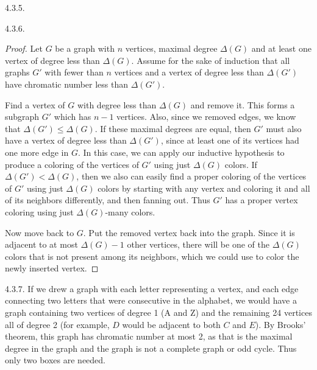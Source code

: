 \begin {itemize}
\begin{ans}{4.3.5.}
		\begin{center}
		\end{center}
	
\end{ans}
\begin{ans}{4.3.6.}
		\begin{proof}
		Let $G$ be a graph with $n$ vertices, maximal degree $\Delta(G)$ and at least one vertex of degree less than $\Delta(G)$.  Assume for the sake of induction that all graphs $G'$ with fewer than $n$ vertices and a vertex of degree less than $\Delta(G')$ have chromatic number less than $\Delta(G')$.

		Find a vertex of $G$ with degree less than $\Delta(G)$ and remove it.  This forms a subgraph $G'$ which has $n-1$ vertices.  Also, since we removed edges, we know that $\Delta(G') \le \Delta(G)$.  If these maximal degrees are equal, then $G'$ must also have a vertex of degree less than $\Delta(G')$, since at least one of its vertices had one more edge in $G$.  In this case, we can apply our inductive hypothesis to produce a coloring of the vertices of $G'$ using just $\Delta(G)$ colors.  If $\Delta(G') < \Delta(G)$, then we also can easily find a proper coloring of the vertices of $G'$ using just $\Delta(G)$ colors by starting with any vertex and coloring it and all of its neighbors differently, and then fanning out.  Thus $G'$ has a proper vertex coloring using just $\Delta(G)$-many colors.

		Now move back to $G$.  Put the removed vertex back into the graph.  Since it is adjacent to at most $\Delta(G) - 1$ other vertices, there will be one of the $\Delta(G)$ colors that is not present among its neighbors, which we could use to color the newly inserted vertex.
		\end{proof}
	
\end{ans}
\begin{ans}{4.3.7.}
		If we drew a graph with each letter representing a vertex, and each edge connecting two letters that were consecutive in the alphabet, we would have a graph containing two vertices of degree 1 (A and Z) and the remaining 24 vertices all of degree 2 (for example, $D$ would be adjacent to both $C$ and $E$).  By Brooks' theorem, this graph has chromatic number at most 2, as that is the maximal degree in the graph and the graph is not a complete graph or odd cycle.  Thus only two boxes are needed.
	
\end{ans}
\protect \end {itemize}
